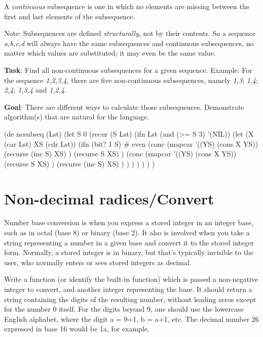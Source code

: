 A \emph{continuous} subsequence is one in which no elements are missing
between the first and last elements of the subsequence.

Note: Subsequences are defined \emph{structurally}, not by their
contents. So a sequence \emph{a,b,c,d} will always have the same
subsequences and continuous subsequences, no matter which values are
substituted; it may even be the same value.

\textbf{Task}: Find all non-continuous subsequences for a given
sequence. Example: For the sequence \emph{1,2,3,4}, there are five
non-continuous subsequences, namely \emph{1,3}; \emph{1,4}; \emph{2,4};
\emph{1,3,4} and \emph{1,2,4}.

\textbf{Goal}: There are different ways to calculate those subsequences.
Demonstrate algorithm(s) that are natural for the language.


\begin{wideverbatim}

(de ncsubseq (Lst)
   (let S 0
      (recur (S Lst)
         (ifn Lst
            (and (>= S 3) '(NIL))
            (let (X (car Lst)  XS (cdr Lst))
               (ifn (bit? 1 S)  # even
                  (conc
                     (mapcar '((YS) (cons X YS))
                        (recurse (inc S) XS) )
                     (recurse S XS) )
                  (conc
                     (mapcar '((YS) (cons X YS))
                        (recurse S XS) )
                     (recurse (inc S) XS) ) ) ) ) ) ) )

\end{wideverbatim}

\pagebreak{}
\section*{Non-decimal radices/Convert}

Number base conversion is when you express a stored integer in an
integer base, such as in octal (base 8) or binary (base 2). It also is
involved when you take a string representing a number in a given base
and convert it to the stored integer form. Normally, a stored integer is
in binary, but that's typically invisible to the user, who normally
enters or sees stored integers as decimal.

Write a function (or identify the built-in function) which is passed a
non-negative integer to convert, and another integer representing the
base. It should return a string containing the digits of the resulting
number, without leading zeros except for the number 0 itself. For the
digits beyond 9, one should use the lowercase English alphabet, where
the digit a = 9+1, b = a+1, etc. The decimal number 26 expressed in base
16 would be 1a, for example.

